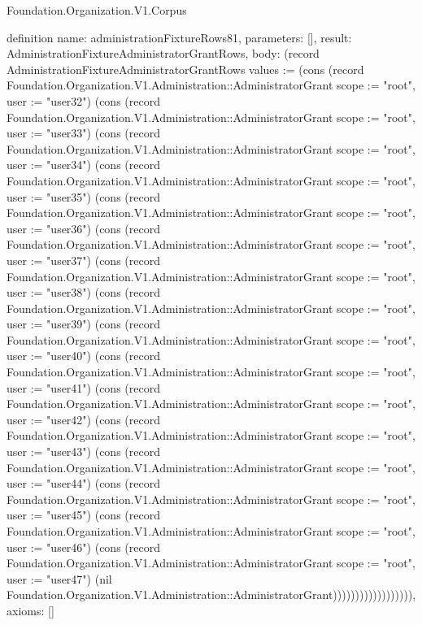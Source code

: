 \begin{lexlean}{Foundation.Organization.V1.Corpus}
\begin{semanticmodule}
definition{
  name: administrationFixtureRows81,
  parameters: [],
  result: AdministrationFixtureAdministratorGrantRows,
  body: (record AdministrationFixtureAdministratorGrantRows {values := (cons (record Foundation.Organization.V1.Administration::AdministratorGrant {scope := "root", user := "user32"}) (cons (record Foundation.Organization.V1.Administration::AdministratorGrant {scope := "root", user := "user33"}) (cons (record Foundation.Organization.V1.Administration::AdministratorGrant {scope := "root", user := "user34"}) (cons (record Foundation.Organization.V1.Administration::AdministratorGrant {scope := "root", user := "user35"}) (cons (record Foundation.Organization.V1.Administration::AdministratorGrant {scope := "root", user := "user36"}) (cons (record Foundation.Organization.V1.Administration::AdministratorGrant {scope := "root", user := "user37"}) (cons (record Foundation.Organization.V1.Administration::AdministratorGrant {scope := "root", user := "user38"}) (cons (record Foundation.Organization.V1.Administration::AdministratorGrant {scope := "root", user := "user39"}) (cons (record Foundation.Organization.V1.Administration::AdministratorGrant {scope := "root", user := "user40"}) (cons (record Foundation.Organization.V1.Administration::AdministratorGrant {scope := "root", user := "user41"}) (cons (record Foundation.Organization.V1.Administration::AdministratorGrant {scope := "root", user := "user42"}) (cons (record Foundation.Organization.V1.Administration::AdministratorGrant {scope := "root", user := "user43"}) (cons (record Foundation.Organization.V1.Administration::AdministratorGrant {scope := "root", user := "user44"}) (cons (record Foundation.Organization.V1.Administration::AdministratorGrant {scope := "root", user := "user45"}) (cons (record Foundation.Organization.V1.Administration::AdministratorGrant {scope := "root", user := "user46"}) (cons (record Foundation.Organization.V1.Administration::AdministratorGrant {scope := "root", user := "user47"}) (nil Foundation.Organization.V1.Administration::AdministratorGrant)))))))))))))))))}),
  axioms: []
}


\end{semanticmodule}
\end{lexlean}
